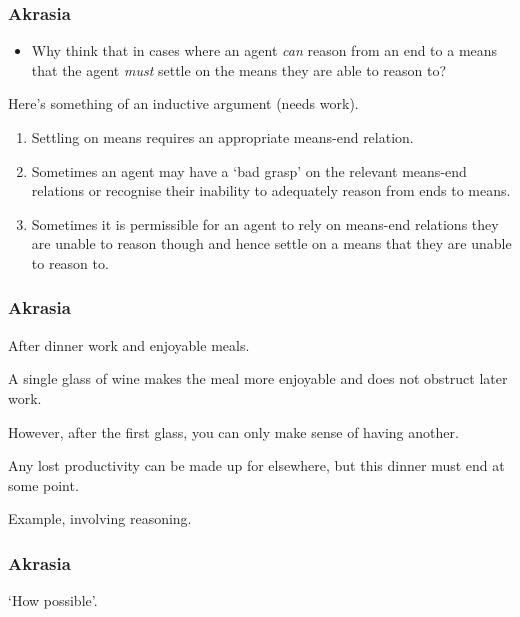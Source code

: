 \documentclass[noamssymb,
graphics,
]{beamer} %
\newcommand{\hand}{\ding{43}}
\newcommand{\hozlinedash}[0]{
  \noindent\hdashrule[0.5ex][c]{\textwidth}{.1pt}{2.5pt}
}
\begin{document}
\begin{frame}
  \frametitle{Akrasia}

  \begin{itemize}
  \item[\hand] Why think that in cases where an agent \emph{can} reason from an end to a means that the agent \emph{must} settle on the means they are able to reason to?
  \end{itemize}

  Here's something of an inductive argument (needs work).

\begin{enumerate}
\item Settling on means requires an appropriate means-end relation.
\item Sometimes an agent may have a `bad grasp' on the relevant means-end relations or recognise their inability to adequately reason from ends to means.
\item Sometimes it is permissible for an agent to rely on means-end relations they are unable to reason though and hence settle on a means that they are unable to reason to.
\end{enumerate}
\end{frame}

\begin{frame}
  \frametitle{Akrasia}

  {\rmfamily
    After dinner work and enjoyable meals.

    A single glass of wine makes the meal more enjoyable and does not obstruct later work.

    However, after the first glass, you can only make sense of having another.

    Any lost productivity can be made up for elsewhere, but this dinner must end at some point.
  }

  \hozlinedash

  Example, involving reasoning.
\end{frame}

\begin{frame}
  \frametitle{Akrasia}

  `How possible'.
\end{frame}
\end{document}
